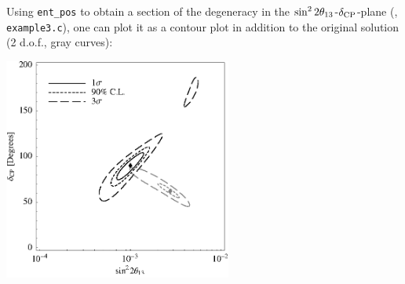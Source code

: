 {Using {\tt ent\_pos} to obtain a section of the degeneracy in the
$\sin^2 2 \theta_{13}$-$\delta_{\mathrm{CP}}$-plane (\cf, {\tt example3.c}), one can plot it as a contour plot in addition to the original solution (2 d.o.f., gray curves):
\begin{center}
\colorbox{white}{\includegraphics[width=7.5cm]{correntex}}
\end{center}

}

